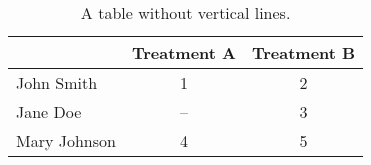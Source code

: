\begin{table}[!h]
	\centering
	\begin{tabular}{lcc}
		\hline
		             & \textbf{Treatment A} & \textbf{Treatment B} \\
		\hline
		John Smith   & 1           & 2           \\
		Jane Doe     & --          & 3           \\
		Mary Johnson & 4           & 5           \\
		\hline
	\end{tabular}
	\caption{A table without vertical lines.}
	\label{table:treatment}
\end{table}